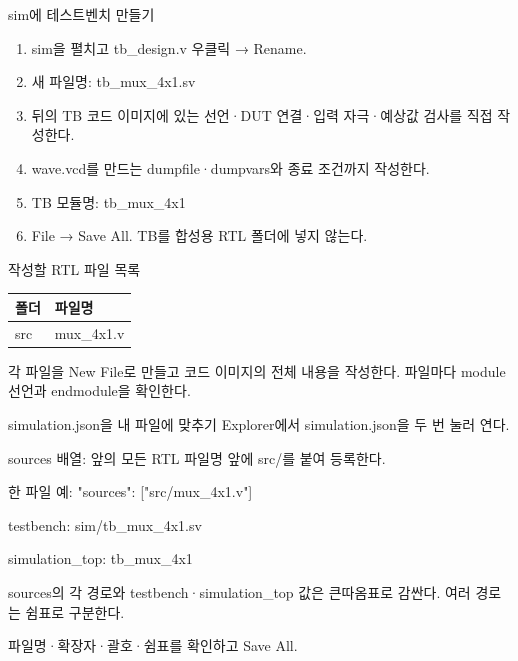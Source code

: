 \begin{frame}{sim에 테스트벤치 만들기}\relax
\small
\begin{enumerate}\setlength{\itemsep}{0.22cm}
\item sim을 펼치고 tb\_design.v 우클릭 → Rename.
\item 새 파일명: tb\_mux\_4x1.sv
\item 뒤의 TB 코드 이미지에 있는 선언·DUT 연결·입력 자극·예상값 검사를 직접 작성한다.
\item wave.vcd를 만드는 dumpfile·dumpvars와 종료 조건까지 작성한다.
\item TB 모듈명: tb\_mux\_4x1
\item File → Save All. TB를 합성용 RTL 폴더에 넣지 않는다.
\end{enumerate}

\end{frame}

\begin{frame}{작성할 RTL 파일 목록}\relax
\small
\begin{center}\renewcommand{\arraystretch}{1.45}
\begin{tabular}{l|l}
폴더 & 파일명\\\hline
src & mux\_4x1.v\\
\end{tabular}\end{center}
각 파일을 New File로 만들고 코드 이미지의 전체 내용을 작성한다. 파일마다 module 선언과 endmodule을 확인한다.\par
\end{frame}

\begin{frame}{simulation.json을 내 파일에 맞추기}\relax
\small
Explorer에서 simulation.json을 두 번 눌러 연다.\par\vspace{0.22cm}sources 배열: 앞의 모든 RTL 파일명 앞에 src/를 붙여 등록한다.\par\vspace{0.22cm}한 파일 예: "sources": ["src/mux\_4x1.v"]\par\vspace{0.22cm}testbench: sim/tb\_mux\_4x1.sv\par\vspace{0.22cm}simulation\_top: tb\_mux\_4x1\par\vspace{0.22cm}sources의 각 경로와 testbench·simulation\_top 값은 큰따옴표로 감싼다. 여러 경로는 쉼표로 구분한다.\par\vspace{0.22cm}파일명·확장자·괄호·쉼표를 확인하고 Save All.\par
\end{frame}


